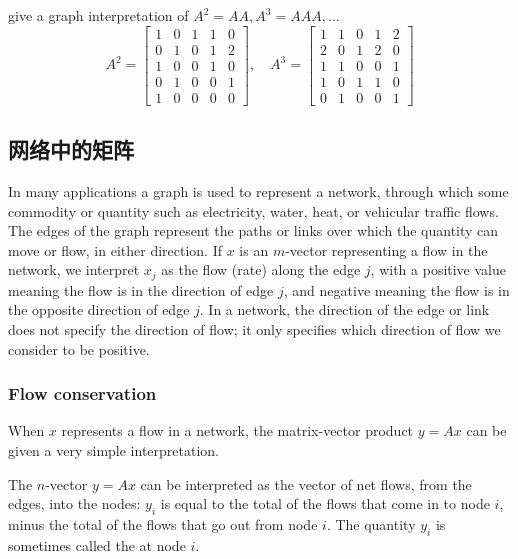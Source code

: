 \begin{example}[路径矩阵]
    give a graph interpretation of $ A^{2}=A A, A^{3}=A A A, \ldots $
$$
A^{2}=\left[\begin{array}{lllll}
1 & 0 & 1 & 1 & 0 \\
0 & 1 & 0 & 1 & 2 \\
1 & 0 & 0 & 1 & 0 \\
0 & 1 & 0 & 0 & 1 \\
1 & 0 & 0 & 0 & 0
\end{array}\right], \quad A^{3}=\left[\begin{array}{lllll}
1 & 1 & 0 & 1 & 2 \\
2 & 0 & 1 & 2 & 0 \\
1 & 1 & 0 & 0 & 1 \\
1 & 0 & 1 & 1 & 0 \\
0 & 1 & 0 & 0 & 1
\end{array}\right]
$$
\end{example}


\subsection{网络中的矩阵}

In many applications a graph is used to represent a network, through which some commodity or quantity such as electricity, water, heat, or vehicular traffic flows. The edges of the graph represent the paths or links over which the quantity can move or flow, in either direction. If $ x $ is an $ m $-vector representing a flow in the network, we interpret $ x_{j} $ as the flow (rate) along the edge $ j $, with a positive value meaning the flow is in the direction of edge $ j $, and negative meaning the flow is in the opposite direction of edge $ j $. In a network, the direction of the edge or link does not specify the direction of flow; it only specifies which direction of flow we consider to be positive.

\subsubsection{Flow conservation}

When $ x $ represents a flow in a network, the matrix-vector product $ y=A x $ can be given a very simple interpretation. 

The $ n $-vector $ y=A x $ can be interpreted as the vector of net flows, from the edges, into the nodes: $ y_{i} $ is equal to the total of the flows that come in to node $ i $, minus the total of the flows that go out from node $ i $. The quantity $ y_{i} $ is sometimes called the  at node $ i $.

